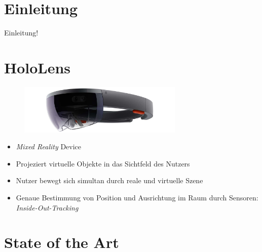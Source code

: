 \part{Einleitung}
\label{part:intro}

\begin{frame}[fragile]{}
Einleitung!
\end{frame}

\part{HoloLens}
\label{part:hololens}
\begin{frame}[fragile]{}
\begin{figure}[h!]
	\centering
	\includegraphics[width=0.7\textwidth]{images/hololens.jpg}
\end{figure}
\begin{itemize}
	\pause
	\item \textit{Mixed Reality} Device
	\pause
	\item Projeziert virtuelle Objekte in das Sichtfeld des Nutzers
	\pause
	\item Nutzer bewegt sich simultan durch reale und virtuelle Szene
	\pause
	\item Genaue Bestimmung von Position und Ausrichtung im Raum durch Sensoren: \textit{Inside-Out-Tracking}
\end{itemize}	
\end{frame}

\part{State of the Art}
\label{part:sota}

